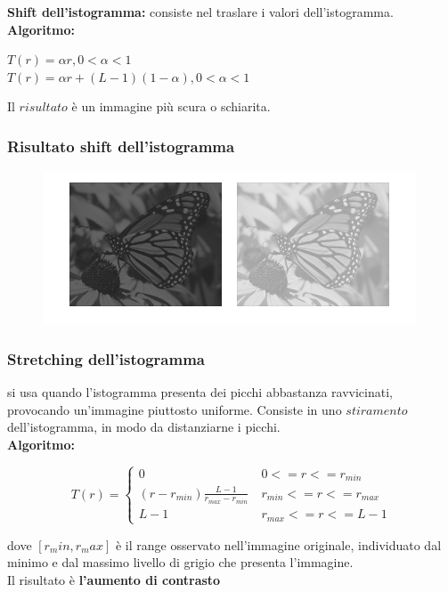 \textbf{Shift dell’istogramma:} consiste nel traslare i valori dell’istogramma.
\\\textbf{Algoritmo:}
\begin{center}
    $T(r) = \alpha r, 0 < \alpha < 1$
    \\
    $T(r) = \alpha r + (L-1)(1-\alpha), 0<\alpha<1$
\end{center}
Il $risultato$ è un immagine più scura o schiarita.

\subsubsection{Risultato shift dell'istogramma}

\begin{figure}[H]
    \centering
    \includegraphics[width=\linewidth, keepaspectratio]{capitoli/immagini/imgs/shift-isto.png}
\end{figure}

\subsubsection{Stretching dell’istogramma}

si usa quando l’istogramma presenta dei picchi abbastanza ravvicinati, provocando un’immagine
piuttosto uniforme. Consiste in uno $stiramento$ dell’istogramma, in modo da distanziarne i picchi.
\\\textbf{Algoritmo:}
\begin{center}
    $$
        T(r) = \left\{ \begin{array}{cl}
            0                                         & \ 0 <= r <= r_{min}       \\
            (r - r_{min}) \frac{L-1}{r_{max}-r_{min}} & \ r_{min} <= r <= r_{max} \\
            L-1                                       & \ r_{max} <= r <= L-1
        \end{array} \right.
    $$
\end{center}
dove $[r_min, r_max ]$ è il range osservato nell’immagine originale, individuato dal minimo e dal massimo livello di grigio che presenta
l’immagine.
\\Il risultato è \textbf{l'aumento di contrasto}

